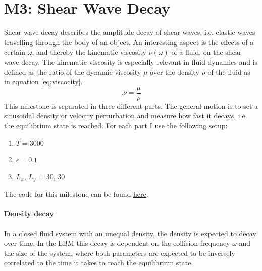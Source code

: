 \section{M3: Shear Wave Decay}
Shear wave decay describes the amplitude decay of shear waves, i.e. elastic waves travelling through the body of an object.
An interesting aspect is the effects of a certain $\omega$, and thereby the kinematic viscosity $\nu(\omega)$ of a fluid, on the shear wave decay.
The kinematic viscosity is especially relevant in fluid dynamics and is defined as the ratio of the dynamic viscosity $\mu$ over the density $\rho$ of the fluid as in equation \ref{eq:viscocity}.
\begin{equation}\label{eq:viscocity}.
\nu = \frac{\mu}{\rho}
\end{equation}
This milestone is separated in three different parts. 
The general motion is to set a sinusoidal density or velocity
perturbation and measure how fast it decays, i.e. the equilibrium state is reached.
For each part I use the following setup:
\begin{enumerate}
    \item $T = 3000$
    \item $\epsilon = 0.1$
    \item $L_{x}$, $L_{y}$ = 30, 30
\end{enumerate}
The code for this milestone can be found \href{https://github.com/jonas27/pylbm/tree/master/milestones/m3}{here}.

\paragraph{Density decay} 
In a closed fluid system with an unequal density, the density is expected to decay over time. In the LBM this decay is dependent on the collision frequency $\omega$ and the size of the system, where both parameters are expected to be inversely correlated to the time it takes to reach the equilibrium state.

